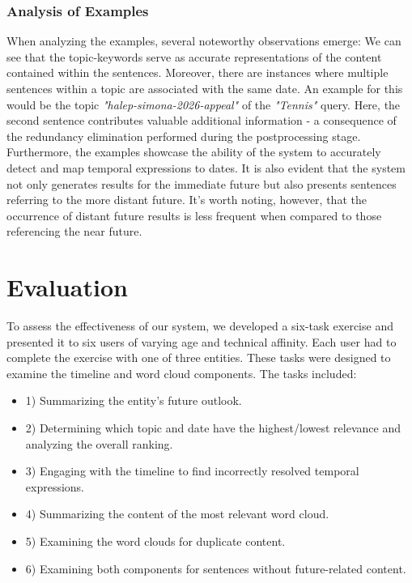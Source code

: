 \documentclass[12pt,oneside,bibtotoc,liststotoc]{scrbook}
\begin{document}
\subsection{Analysis of Examples}
When analyzing the examples, several noteworthy observations emerge:
We can see that the topic-keywords serve as accurate representations of the content contained within the sentences.
Moreover, there are instances where multiple sentences within a topic are associated with the same date. An example for this would be the topic \textit{"halep-simona-2026-appeal"} of the \textit{"Tennis"} query.
Here, the second sentence contributes valuable additional information - a consequence of the redundancy elimination performed during the postprocessing stage.
Furthermore, the examples showcase the ability of the system to accurately detect and map temporal expressions to dates.
It is also evident that the system not only generates results for the immediate future but also presents sentences referring to the more distant future.
It's worth noting, however, that the occurrence of distant future results is less frequent when compared to those referencing the near future.


\chapter{Evaluation}

To assess the effectiveness of our system, we developed a six-task exercise and presented it to six users of varying age and technical affinity. Each user had to complete the exercise with one of three entities. These tasks were designed to examine the timeline and word cloud components. The tasks included:
\begin{itemize}
  \item 1) Summarizing the entity's future outlook.
  \item 2) Determining which topic and date have the highest/lowest relevance and analyzing the overall ranking.
  \item 3) Engaging with the timeline to find incorrectly resolved temporal expressions.
  \item 4) Summarizing the content of the most relevant word cloud.
  \item 5) Examining the word clouds for duplicate content.
  \item 6) Examining both components for sentences without future-related content.
\end{itemize}
\end{document}
